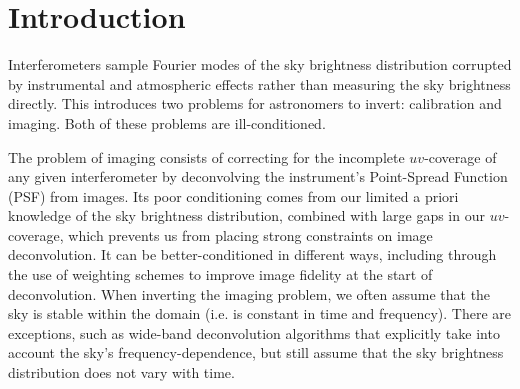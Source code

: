 

\section{Introduction}\label{sec.intro}

\pg
Interferometers sample Fourier modes of the sky brightness distribution corrupted by instrumental and atmospheric effects rather than measuring the sky brightness directly.
This introduces two problems for astronomers to invert: calibration and imaging. Both of these problems are ill-conditioned.

\pg
The problem of imaging consists of correcting for the incomplete $uv$-coverage of any given interferometer by deconvolving the instrument's {Point-Spread Function (PSF)} from images. Its poor conditioning comes from our limited a priori knowledge of the sky brightness distribution, combined with large gaps in our $uv$-coverage, which prevents us from placing strong constraints on image deconvolution. It can be better-conditioned in different ways, including through the use of weighting schemes \citep[see][and references therein]{1995AAS...18711202B,2014MNRAS.444..790Y} to improve image fidelity at the start of deconvolution. When inverting the imaging problem, we often assume that {the sky} is stable within the domain (i.e. {is} constant in time and frequency). There are exceptions, such as wide-band deconvolution algorithms \citep[e.g.][]{2011A&A...532A..71R} that explicitly take into account the {sky}'s frequency-dependence, but still assume that the sky brightness distribution does not vary with time.


